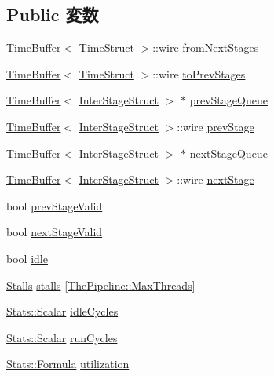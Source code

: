 \subsection*{Public 変数}
\begin{DoxyCompactItemize}
\item 
\hyperlink{classTimeBuffer}{TimeBuffer}$<$ \hyperlink{structTimeStruct}{TimeStruct} $>$::wire \hyperlink{classPipelineStage_a728ac6e701ecba86ee9e8d15ae07d53f}{fromNextStages}
\item 
\hyperlink{classTimeBuffer}{TimeBuffer}$<$ \hyperlink{structTimeStruct}{TimeStruct} $>$::wire \hyperlink{classPipelineStage_ad270a1de154f2e748a16880469c9baea}{toPrevStages}
\item 
\hyperlink{classTimeBuffer}{TimeBuffer}$<$ \hyperlink{structInterStageStruct}{InterStageStruct} $>$ $\ast$ \hyperlink{classPipelineStage_af54931163e4bdb38a1295065af735582}{prevStageQueue}
\item 
\hyperlink{classTimeBuffer}{TimeBuffer}$<$ \hyperlink{structInterStageStruct}{InterStageStruct} $>$::wire \hyperlink{classPipelineStage_a560e9ae4ad5991a1789e95d33f59503b}{prevStage}
\item 
\hyperlink{classTimeBuffer}{TimeBuffer}$<$ \hyperlink{structInterStageStruct}{InterStageStruct} $>$ $\ast$ \hyperlink{classPipelineStage_aa6321826776981dc0e21fbdeefe52016}{nextStageQueue}
\item 
\hyperlink{classTimeBuffer}{TimeBuffer}$<$ \hyperlink{structInterStageStruct}{InterStageStruct} $>$::wire \hyperlink{classPipelineStage_a7a06bbc61668c11d11fde945df559f55}{nextStage}
\item 
bool \hyperlink{classPipelineStage_abb343738ea92390af4fbc30bc718d1bc}{prevStageValid}
\item 
bool \hyperlink{classPipelineStage_a74cfb32df253cbcbf5d70e6523492d2d}{nextStageValid}
\item 
bool \hyperlink{classPipelineStage_a97808a9870039f4168da10ecfb5dc472}{idle}
\item 
\hyperlink{structPipelineStage_1_1Stalls}{Stalls} \hyperlink{classPipelineStage_aa7522ea079359a7730812c7091dbb4a5}{stalls} \mbox{[}\hyperlink{namespaceThePipeline_ac9c0bbe9cf27d93e08ea8ccc4096e633}{ThePipeline::MaxThreads}\mbox{]}
\item 
\hyperlink{classStats_1_1Scalar}{Stats::Scalar} \hyperlink{classPipelineStage_a42e0f4c18fdb8ef7504f5c45d697fb14}{idleCycles}
\item 
\hyperlink{classStats_1_1Scalar}{Stats::Scalar} \hyperlink{classPipelineStage_af9addd340a133c2f4add363a3055b019}{runCycles}
\item 
\hyperlink{classStats_1_1Formula}{Stats::Formula} \hyperlink{classPipelineStage_a04353589e0e920909d3ceb8e73abb7ac}{utilization}
\end{DoxyCompactItemize}
